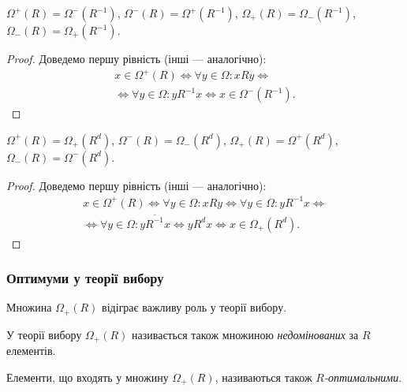 \begin{theorem}
	$\Omega^+(R) = \Omega^-\left(R^{-1}\right)$, $\Omega^-(R) = \Omega^+\left(R^{-1}\right)$, $\Omega_+(R) = \Omega_-\left(R^{-1}\right)$, $\Omega_-(R) = \Omega_+\left(R^{-1}\right)$.
\end{theorem}

\begin{proof}
	Доведемо першу рівність (інші --- аналогічно): 
	\begin{multline}
		x \in \Omega^+(R) \iff \forall y \in \Omega: x R y \iff \\
		\iff \forall y \in \Omega: y R^{-1} x \iff x \in \Omega^-\left(R^{-1}\right).
	\end{multline}
\end{proof}

\begin{theorem}
	$\Omega^+(R) = \Omega_+\left(R^d\right)$, $\Omega^-(R) = \Omega_-\left(R^d\right)$, $\Omega_+(R) = \Omega^+\left(R^d\right)$, $\Omega_-(R) = \Omega^-\left(R^d\right)$.
\end{theorem}

\begin{proof}
	Доведемо першу рівність (інші --- аналогічно): 
	\begin{multline} 
		x \in \Omega^+(R) \iff \forall y \in \Omega: x R y \iff \forall y \in \Omega: y R^{-1} x \iff \\ 
		\iff \forall y \in \Omega: y \overline{R^{-1}} x \iff y R^d x \iff x \in \Omega_+\left(R^d\right). 
	\end{multline}
\end{proof}

\subsubsection{Оптимуми у теорії вибору}

Множина $\Omega_+(R)$ відіграє важливу роль у теорії вибору.

\begin{definition}
	У теорії вибору $\Omega_+(R)$ називається також множиною \textit{недомінованих} за $R$ елементів.
\end{definition}

\begin{definition}
	Елементи, що входять у множину $\Omega_+(R)$, називаються також \textit{$R$-оптимальними}.
\end{definition}

